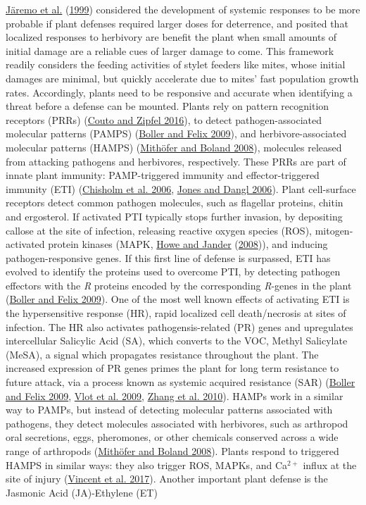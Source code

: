 \documentclass[12pt,final,CPage]{ufthesis}
\begin{document}
{  \protect\hyperlink{ref-Jaeremo1999}{Järemo et al.} (\protect\hyperlink{ref-Jaeremo1999}{1999}) considered the development of systemic responses to be more probable if plant defenses required larger doses for deterrence, and posited that localized responses to herbivory are benefit the plant when small amounts of initial damage are a reliable cues of larger damage to come. This framework readily considers the feeding activities of stylet feeders like mites, whose initial damages are minimal, but quickly accelerate due to mites' fast population growth rates. Accordingly, plants need to be responsive and accurate when identifying a threat before a defense can be mounted. Plants rely on pattern recognition receptors (PRRs) (\protect\hyperlink{ref-Couto2016}{Couto and Zipfel 2016}), to detect pathogen-associated molecular patterns (PAMPS) (\protect\hyperlink{ref-Boller2009}{Boller and Felix 2009}), and herbivore-associated molecular patterns (HAMPS) (\protect\hyperlink{ref-Mithoefer2008}{Mithöfer and Boland 2008}), molecules released from attacking pathogens and herbivores, respectively. These PRRs are part of innate plant immunity: PAMP-triggered immunity and effector-triggered immunity (ETI) (\protect\hyperlink{ref-Chisholm2006}{Chisholm et al. 2006}, \protect\hyperlink{ref-Jones2006}{Jones and Dangl 2006}). Plant cell-surface receptors detect common pathogen molecules, such as flagellar proteins, chitin and ergosterol. If activated PTI typically stops further invasion, by depositing callose at the site of infection, releasing reactive oxygen species (ROS), mitogen-activated protein kinases (MAPK, \protect\hyperlink{ref-Howe2008}{Howe and Jander} (\protect\hyperlink{ref-Howe2008}{2008})), and inducing pathogen-responsive genes. If this first line of defense is surpassed, ETI has evolved to identify the proteins used to overcome PTI, by detecting pathogen effectors with the \emph{R} proteins encoded by the corresponding \emph{R}-genes in the plant (\protect\hyperlink{ref-Boller2009}{Boller and Felix 2009}). One of the most well known effects of activating ETI is the hypersensitive response (HR), rapid localized cell death/necrosis at sites of infection. The HR also activates pathogensis-related (PR) genes and upregulates intercellular Salicylic Acid (SA), which converts to the VOC, Methyl Salicylate (MeSA), a signal which propagates resistance throughout the plant. The increased expression of PR genes primes the plant for long term resistance to future attack, via a process known as systemic acquired resistance (SAR) (\protect\hyperlink{ref-Boller2009}{Boller and Felix 2009}, \protect\hyperlink{ref-Vlot2009}{Vlot et al. 2009}, \protect\hyperlink{ref-Zhang2010}{Zhang et al. 2010}). HAMPs work in a similar way to PAMPs, but instead of detecting molecular patterns associated with pathogens, they detect molecules associated with herbivores, such as arthropod oral secretions, eggs, pheromones, or other chemicals conserved across a wide range of arthropods (\protect\hyperlink{ref-Mithoefer2008}{Mithöfer and Boland 2008}). Plants respond to triggered HAMPS in similar ways: they also trigger ROS, MAPKs, and Ca\({^{2+}}\) influx at the site of injury (\protect\hyperlink{ref-Vincent2017}{Vincent et al. 2017}). Another important plant defense is the Jasmonic Acid (JA)-Ethylene (ET) }
\end{document}

